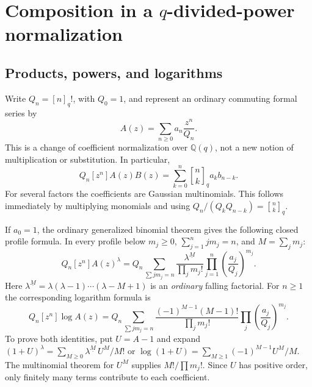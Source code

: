 \documentclass[11pt,a4paper]{article}
\numberwithin{equation}{section}
\theoremstyle{definition}
\theoremstyle{remark}
\newcommand{\Q}{\mathbb Q}
\newcommand{\G}[2]{\genfrac{[}{]}{0pt}{}{#1}{#2}_{q}}
\newcommand{\qfac}[1]{[#1]_q!}
\newcommand{\coef}[2]{[#1^{#2}]}
\newcommand{\fall}[2]{#1^{\underline{#2}}}
\begin{document}
\section{Composition in a \texorpdfstring{$q$}{q}-divided-power normalization}
\label{sec:composition}

\subsection{Products, powers, and logarithms}
Write $Q_n=\qfac n$, with $Q_0=1$, and represent an ordinary commuting
formal series by
\[
 A(z)=\sum_{n\ge0}a_n\frac{z^n}{Q_n}.
\]
This is a change of coefficient normalization over $\Q(q)$, not a new
notion of multiplication or substitution. In particular,
\begin{equation}
 Q_n\coef zn A(z)B(z)=\sum_{k=0}^n\G nk a_kb_{n-k}.
 \label{eq:q-normalized-product}
\end{equation}
For several factors the coefficients are Gaussian multinomials. This
follows immediately by multiplying monomials and using
$Q_n/(Q_kQ_{n-k})=\G nk$.

If $a_0=1$, the ordinary generalized binomial theorem gives the following
closed profile formula. In every profile below $m_j\ge0$,
$\sum_{j=1}^n jm_j=n$, and $M=\sum_jm_j$:
\begin{equation}
 Q_n\coef zn A(z)^\lambda
 =Q_n\sum_{\sum jm_j=n}
      \frac{\fall\lambda M}{\prod_jm_j!}
      \prod_{j=1}^n\left(\frac{a_j}{Q_j}\right)^{m_j}.
 \label{eq:q-normalized-power}
\end{equation}
Here $\fall\lambda M=\lambda(\lambda-1)\cdots(\lambda-M+1)$ is an
\emph{ordinary} falling factorial. For $n\ge1$ the corresponding
logarithm formula is
\begin{equation}
 Q_n\coef zn\log A(z)
 =Q_n\sum_{\sum jm_j=n}
       \frac{(-1)^{M-1}(M-1)!}{\prod_jm_j!}
       \prod_j\left(\frac{a_j}{Q_j}\right)^{m_j}.
 \label{eq:q-normalized-log}
\end{equation}
To prove both identities, put $U=A-1$ and expand
$(1+U)^\lambda=\sum_{M\ge0}\fall\lambda M\,U^M/M!$ or
$\log(1+U)=\sum_{M\ge1}(-1)^{M-1}U^M/M$. The multinomial theorem for
$U^M$ supplies $M!/\prod m_j!$. Since $U$ has positive order, only
finitely many terms contribute to each coefficient.
\end{document}
